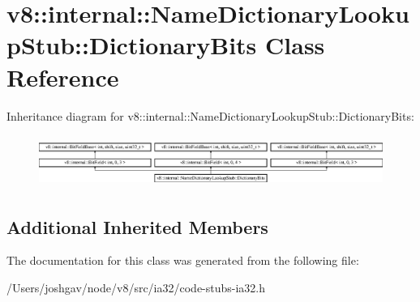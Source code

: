 \hypertarget{classv8_1_1internal_1_1_name_dictionary_lookup_stub_1_1_dictionary_bits}{}\section{v8\+:\+:internal\+:\+:Name\+Dictionary\+Lookup\+Stub\+:\+:Dictionary\+Bits Class Reference}
\label{classv8_1_1internal_1_1_name_dictionary_lookup_stub_1_1_dictionary_bits}
Inheritance diagram for v8\+:\+:internal\+:\+:Name\+Dictionary\+Lookup\+Stub\+:\+:Dictionary\+Bits\+:\begin{figure}[H]
\begin{center}
\leavevmode
\includegraphics[height=1.707317cm]{classv8_1_1internal_1_1_name_dictionary_lookup_stub_1_1_dictionary_bits}
\end{center}
\end{figure}
\subsection*{Additional Inherited Members}


The documentation for this class was generated from the following file\+:\begin{DoxyCompactItemize}
\item 
/\+Users/joshgav/node/v8/src/ia32/code-\/stubs-\/ia32.\+h\end{DoxyCompactItemize}
